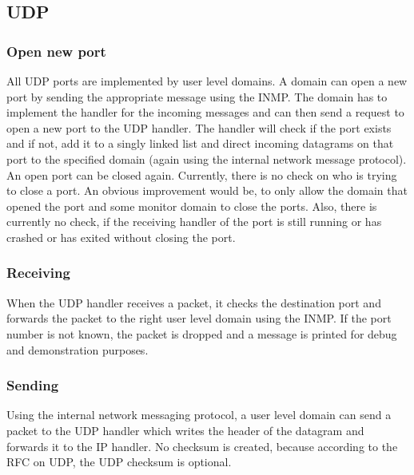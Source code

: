 \subsection{UDP}
\subsubsection{Open new port}
All UDP ports are implemented by user level domains. A domain can open a new port by sending the appropriate message using the INMP. The domain has to implement the handler for the incoming messages and can then send a request to open a new port to the UDP handler. The handler will check if the port exists and if not, add it to a singly linked list and direct incoming datagrams on that port to the specified domain (again using the internal network message protocol). An open port can be closed again. Currently, there is no check on who is trying to close a port. An obvious improvement would be, to only allow the domain that opened the port and some monitor domain to close the ports. Also, there is currently no check, if the receiving handler of the port is still running or has crashed or has exited without closing the port.

\subsubsection{Receiving}
When the UDP handler receives a packet, it checks the destination port and forwards the packet to the right user level domain using the INMP. If the port number is not known, the packet is dropped and a message is printed for debug and demonstration purposes.
\subsubsection{Sending}
Using the internal network messaging protocol, a user level domain can send a packet to the UDP handler which writes the header of the datagram and forwards it to the IP handler. No checksum is created, because according to the RFC on UDP, the UDP checksum is optional.\cite{RFC0768}

